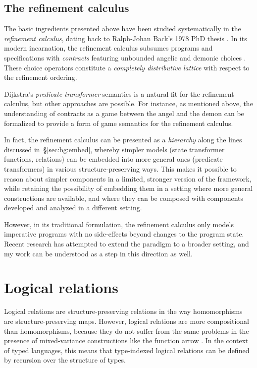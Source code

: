 \documentclass[11pt,oneside]{book}
\theoremstyle{definition}
\begin{document}

\subsection{The refinement calculus} %

The basic ingredients presented above have been studied systematically
in the \emph{refinement calculus},
dating back to Ralph-Johan Back's 1978 PhD thesis \citep{backthesis}.
In its modern incarnation,
the refinement calculus
subsumes programs and specifications with \emph{contracts}
featuring unbounded angelic and demonic choices \citep{refcal}.
These choice operators
constitute a \emph{completely distributive lattice}
with respect to the refinement ordering.

Dijkstra's \emph{predicate transformer} semantics \citep{gc}
is a natural fit for the refinement calculus,
but other approaches are possible.
For instance,
as mentioned above,
the understanding of contracts as a game between
the angel and the demon
can be formalized to provide a form of
game semantics for the refinement calculus.

In fact,
the refinement calculus can be presented as a \emph{hierarchy}
along the lines discussed in~\S\ref{sec:bg:embed},
whereby simpler models (state transformer functions, relations)
can be embedded into more general ones (predicate transformers)
in various structure-preserving ways.
This makes it possible to reason about simpler components
in a limited, stronger version of the framework,
while retaining the possibility of embedding them
in a setting
where more general constructions are available,
and where they can be composed with components
developed and analyzed in a different setting.

However,
in its traditional formulation,
the refinement calculus only models imperative programs
with no side-effects beyond changes to the program state.
Recent research has attempted to extend the paradigm
to a broader setting,
and my work can be understood
as a step in this direction as well.



\section{Logical relations} \label{sec:lr} %

Logical relations are structure-preserving relations
in the way homomorphisms are structure-preserving maps.
However,
logical relations are more compositional than homomorphisms,
because they do not suffer from the same problems
in the presence of mixed-variance constructions
like the function arrow %
\citep{lrp}.
In the context of typed languages,
this means that type-indexed logical relations
can be defined by recursion over the structure of types.
\end{document}
